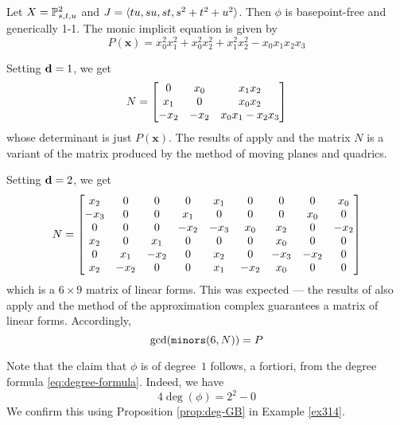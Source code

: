 \documentclass[fleqn,reqno]{amsart}
\begin{document}
\begin{example}[$\mt{ex301}$]
\label{ex301}
Let $X=\mathbb{P}^2_{s,t,u}$ and $J=\langle tu,su,st,s^2+t^2+u^2\rangle$.
Then $\phi$ is basepoint-free and generically 1-1.
The monic implicit equation is given by
\[
	P(\mathbf x)={x}_{0}^{2} {x}_{1}^{2}+{x}_{0}^{2} {x}_{2}^{2}+{x}_{1}^{2}
	{x}_{2}^{2}-{x}_{0} {x}_{1} {x}_{2} {x}_{3}
\]

Setting $\mathbf d=1$, we get
\[
	N=
	\bgroup\begin{bmatrix}0&
      {x}_{0}&
      {x}_{1} {x}_{2}\\
      {x}_{1}&
      0&
      {x}_{0} {x}_{2}\\
      {-{x}_{2}}&
      {-{x}_{2}}&
      {x}_{0} {x}_{1}-{x}_{2} {x}_{3}\\
      \end{bmatrix}\egroup
\]
whose determinant is just $P(\mathbf x)$.
The results of \citet{CGZ-00} apply and the matrix $N$ is a variant of the matrix
produced by the method of moving planes and quadrics.

Setting $\mathbf d=2$, we get
\[
	N=
	\bgroup\begin{bmatrix}{x}_{2}&
	      0&
	      0&
	      0&
	      {x}_{1}&
	      0&
	      0&
	      0&
	      {x}_{0}\\
	      {-{x}_{3}}&
	      0&
	      0&
	      {x}_{1}&
	      0&
	      0&
	      0&
	      {x}_{0}&
	      0\\
	      0&
	      0&
	      0&
	      {-{x}_{2}}&
	      {-{x}_{3}}&
	      {x}_{0}&
	      {x}_{2}&
	      0&
	      {-{x}_{2}}\\
	      {x}_{2}&
	      0&
	      {x}_{1}&
	      0&
	      0&
	      0&
	      {x}_{0}&
	      0&
	      0\\
	      0&
	      {x}_{1}&
	      {-{x}_{2}}&
	      0&
	      {x}_{2}&
	      0&
	      {-{x}_{3}}&
	      {-{x}_{2}}&
	      0\\
	      {x}_{2}&
	      {-{x}_{2}}&
	      0&
	      0&
	      {x}_{1}&
	      {-{x}_{2}}&
	      {x}_{0}&
	      0&
	      0\\
	      \end{bmatrix}\egroup
\]
which is a $6\times9$ matrix of linear forms.
This was expected --- the results of \cite{BJ-03} also apply and the method
of the approximation complex guarantees a matrix of linear forms.
Accordingly,
\[
	\gcd(\mathop{\tt minors}(6,N))=P
\]

Note that the claim that $\phi$ is of degree~$1$ follows, a fortiori, from the degree formula
\eqref{eq:degree-formula}. Indeed, we have
\[
	4\deg(\phi)=2^2-0
\]
We confirm this using Proposition \ref{prop:deg-GB} in Example \ref{ex314}.
\end{example}
\end{document}
